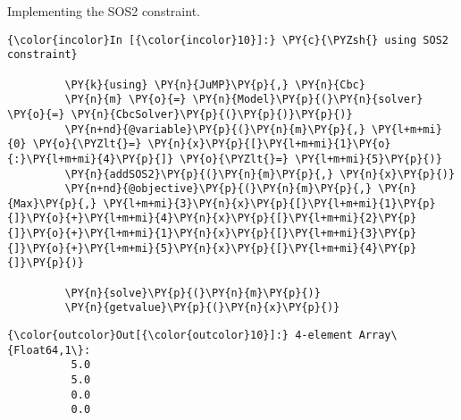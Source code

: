    Implementing the SOS2 constraint.
\begin{codeCell}
\label{code:SOS2}

    \begin{Verbatim}[commandchars=\\\{\}]
{\color{incolor}In [{\color{incolor}10}]:} \PY{c}{\PYZsh{} using SOS2 constraint}
         
         \PY{k}{using} \PY{n}{JuMP}\PY{p}{,} \PY{n}{Cbc}
         \PY{n}{m} \PY{o}{=} \PY{n}{Model}\PY{p}{(}\PY{n}{solver} \PY{o}{=} \PY{n}{CbcSolver}\PY{p}{(}\PY{p}{)}\PY{p}{)}
         \PY{n+nd}{@variable}\PY{p}{(}\PY{n}{m}\PY{p}{,} \PY{l+m+mi}{0} \PY{o}{\PYZlt{}=} \PY{n}{x}\PY{p}{[}\PY{l+m+mi}{1}\PY{o}{:}\PY{l+m+mi}{4}\PY{p}{]} \PY{o}{\PYZlt{}=} \PY{l+m+mi}{5}\PY{p}{)}
         \PY{n}{addSOS2}\PY{p}{(}\PY{n}{m}\PY{p}{,} \PY{n}{x}\PY{p}{)}
         \PY{n+nd}{@objective}\PY{p}{(}\PY{n}{m}\PY{p}{,} \PY{n}{Max}\PY{p}{,} \PY{l+m+mi}{3}\PY{n}{x}\PY{p}{[}\PY{l+m+mi}{1}\PY{p}{]}\PY{o}{+}\PY{l+m+mi}{4}\PY{n}{x}\PY{p}{[}\PY{l+m+mi}{2}\PY{p}{]}\PY{o}{+}\PY{l+m+mi}{1}\PY{n}{x}\PY{p}{[}\PY{l+m+mi}{3}\PY{p}{]}\PY{o}{+}\PY{l+m+mi}{5}\PY{n}{x}\PY{p}{[}\PY{l+m+mi}{4}\PY{p}{]}\PY{p}{)}
         
         \PY{n}{solve}\PY{p}{(}\PY{n}{m}\PY{p}{)}
         \PY{n}{getvalue}\PY{p}{(}\PY{n}{x}\PY{p}{)}
\end{Verbatim}


\begin{Verbatim}[commandchars=\\\{\}]
{\color{outcolor}Out[{\color{outcolor}10}]:} 4-element Array\{Float64,1\}:
          5.0
          5.0
          0.0
          0.0
\end{Verbatim}
                
    \end{codeCell}